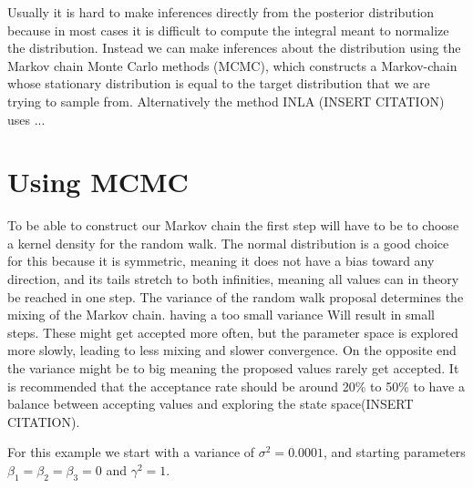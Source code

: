 Usually it is hard to make inferences directly from the posterior distribution because in most cases it is difficult to compute the integral meant to normalize the distribution. Instead we can make inferences about the distribution using the Markov chain Monte Carlo methods (MCMC), which constructs a Markov-chain whose stationary distribution is equal to the target distribution that we are trying to sample from. Alternatively the method INLA (INSERT CITATION) uses ...

\section{Using MCMC}

To  be able to construct our Markov chain the first step will have to be to choose a kernel density for the random walk. The normal distribution is a good choice for this because it is symmetric, meaning it does not have a bias toward any direction, and its tails stretch to both infinities, meaning all values can in theory be reached in one step. The variance of the random walk proposal determines the mixing of the Markov chain. having a too small variance Will result in small steps. These might get accepted more often, but the parameter space is explored more slowly, leading to less mixing and slower convergence. On the opposite end the variance might be to big meaning the proposed values rarely get accepted. It is recommended that the acceptance rate should be around 20\% to 50\% to have a balance between accepting values and exploring the state space(INSERT CITATION). 


For this example we start with a variance of $\sigma^2 = 0.0001$, and starting parameters $\beta_1 = \beta_2 = \beta_3 = 0$ and $\gamma^2 = 1$. 

